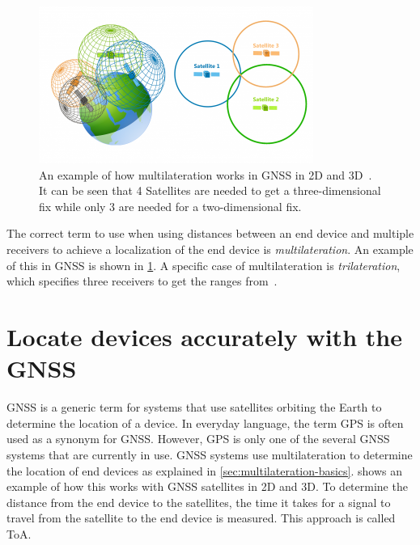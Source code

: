 \begin{figure}[htbp]
    \centering
    \includegraphics[width=0.8\textwidth]{pictures/multilateration/gps_multilateration.png}
    \caption{
        An example of how multilateration works in \ac{GNSS} in 2D and 3D~\protect\cite{gisgeography_how_2018}.
        It can be seen that 4 Satellites are needed to get a three-dimensional fix while only 3 are needed for a two-dimensional fix.
    }\label{pic:multilateration-gps-2d-3d-example}
\end{figure}

The correct term to use when using distances between an end device and multiple receivers to achieve a localization of the end device is \emph{multilateration}.
An example of this in \ac{GNSS} is shown in \cref{pic:multilateration-gps-2d-3d-example}.
A specific case of multilateration is \emph{trilateration}, which specifies three receivers to get the ranges from~\cite{ruiz_efficient_2013}.

\section{Locate devices accurately with the \acl{GNSS}}

\ac{GNSS} is a generic term for systems that use satellites orbiting the Earth to determine the location of a device.
In everyday language, the term \ac{GPS} is often used as a synonym for \ac{GNSS}.
However, \ac{GPS} is only one of the several \ac{GNSS} systems that are currently in use.
\ac{GNSS} systems use multilateration to determine the location of end devices as explained in \cref{sec:multilateration-basics}.
 shows an example of how this works with \ac{GNSS} satellites in 2D and 3D.
To determine the distance from the end device to the satellites, the time it takes for a signal to travel from the satellite to the end device is measured.
This approach is called \acf{ToA}.


